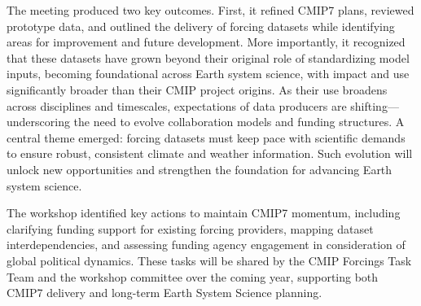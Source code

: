 \documentclass{ametsocV6.1}
\begin{document}
The meeting produced two key outcomes. First, it refined CMIP7 plans, reviewed prototype data, and outlined the delivery of forcing datasets while identifying areas for improvement and future development. More importantly, it recognized that these datasets have grown beyond their original role of standardizing model inputs, becoming foundational across Earth system science, with impact and use significantly broader than their CMIP project origins. As their use broadens across disciplines and timescales, expectations of data producers are shifting—underscoring the need to evolve collaboration models and funding structures. A central theme emerged: forcing datasets must keep pace with scientific demands to ensure robust, consistent climate and weather information. Such evolution will unlock new opportunities and strengthen the foundation for advancing Earth system science.

The workshop identified key actions to maintain CMIP7 momentum, including clarifying funding support for existing forcing providers, mapping dataset interdependencies, and assessing funding agency engagement in consideration of global political dynamics. These tasks will be shared by the CMIP Forcings Task Team and the workshop committee over the coming year, supporting both CMIP7 delivery and long-term Earth System Science planning.
\end{document}

